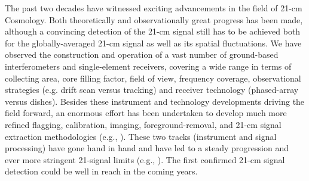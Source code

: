 The past two decades have witnessed exciting advancements in the field of 21-cm Cosmology. Both theoretically and observationally great progress has been made, although a convincing detection of the 21-cm signal still has to be achieved both for the globally-averaged 21-cm signal as well as its spatial fluctuations. 
We have observed the construction and operation of a vast number of ground-based interferometers  and single-element receivers, covering a wide range in terms of collecting area, core filling factor, field of view, frequency coverage, observational strategies (e.g. drift scan versus tracking) and receiver technology (phased-array versus dishes). 
Besides these instrument and technology developments driving the field forward, an enormous effort has been undertaken to develop much more refined flagging, calibration, imaging, foreground-removal, and 21-cm signal extraction methodologies (e.g., \cite{liu19}). These two tracks (instrument and signal processing) have gone hand in hand and have led to a steady progression and ever more stringent 21-signal limits (e.g., \cite{hera19}). The first confirmed 21-cm signal detection could be well in reach in the coming years. 

